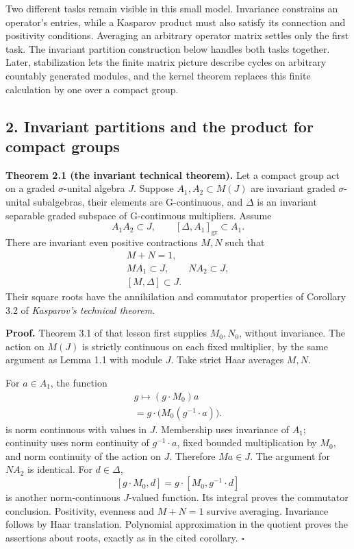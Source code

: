 \documentclass[
  11pt,
]{article}
\begin{document}
Two different tasks remain visible in this small model. Invariance
constrains an operator's entries, while a Kasparov product must also
satisfy its connection and positivity conditions. Averaging an arbitrary
operator matrix settles only the first task. The invariant partition
construction below handles both tasks together. Later, stabilization
lets the finite matrix picture describe cycles on arbitrary countably
generated modules, and the kernel theorem replaces this finite
calculation by one over a compact group.

\subsection{2. Invariant partitions and the product for compact
groups}\label{invariant-partitions-and-the-product-for-compact-groups}

\textbf{Theorem 2.1 (the invariant technical theorem).} Let a compact
group act on a graded \(\sigma\)-unital algebra \(J\). Suppose
\(A_1,A_2\subset M(J)\) are invariant graded \(\sigma\)-unital
subalgebras, their elements are G-continuous, and \(\Delta\) is an
invariant separable graded subspace of G-continuous multipliers. Assume
\[
A_1A_2\subset J,\qquad
[\Delta,A_1]_{\mathrm{gr}}\subset A_1.
\tag{2.1}
\] There are invariant even positive contractions \(M,N\) such that \[
\begin{gathered}
M+N=1,\\
MA_1\subset J,\qquad NA_2\subset J,\\
[M,\Delta]\subset J.
\end{gathered}
\tag{2.2}
\] Their square roots have the annihilation and commutator properties of
Corollary 3.2 of \emph{Kasparov's technical theorem}.

\textbf{Proof.} Theorem 3.1 of that lesson first supplies \(M_0,N_0\),
without invariance. The action on \(M(J)\) is strictly continuous on
each fixed multiplier, by the same argument as Lemma 1.1 with module
\(J\). Take strict Haar averages \(M,N\).

For \(a\in A_1\), the function \[
\begin{gathered}
g\longmapsto(g\cdot M_0)a\\
=g\cdot\bigl(M_0(g^{-1}\cdot a)\bigr).
\end{gathered}
\tag{2.3}
\] is norm continuous with values in \(J\). Membership uses invariance
of \(A_1\); continuity uses norm continuity of \(g^{-1}\cdot a\), fixed
bounded multiplication by \(M_0\), and norm continuity of the action on
\(J\). Therefore \(Ma\in J\). The argument for \(NA_2\) is identical.
For \(d\in\Delta\), \[
[g\cdot M_0,d]
 =g\cdot[M_0,g^{-1}\cdot d]
\tag{2.4}
\] is another norm-continuous \(J\)-valued function. Its integral proves
the commutator conclusion. Positivity, evenness and \(M+N=1\) survive
averaging. Invariance follows by Haar translation. Polynomial
approximation in the quotient proves the assertions about roots, exactly
as in the cited corollary. \(\square\)
\end{document}
